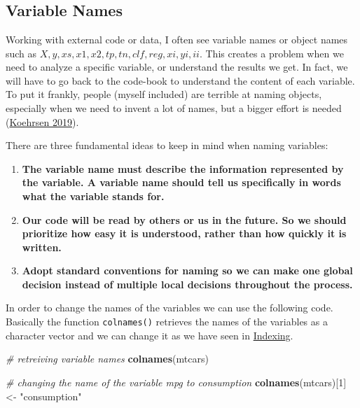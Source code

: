 \documentclass[
]{article}
\newenvironment{Shaded}{\begin{snugshade}}{\end{snugshade}}
\newcommand{\CommentTok}[1]{\textcolor[rgb]{0.56,0.35,0.01}{\textit{#1}}}
\newcommand{\DecValTok}[1]{\textcolor[rgb]{0.00,0.00,0.81}{#1}}
\newcommand{\FunctionTok}[1]{\textcolor[rgb]{0.13,0.29,0.53}{\textbf{#1}}}
\newcommand{\NormalTok}[1]{#1}
\newcommand{\OtherTok}[1]{\textcolor[rgb]{0.56,0.35,0.01}{#1}}
\newcommand{\StringTok}[1]{\textcolor[rgb]{0.31,0.60,0.02}{#1}}
\begin{document}
~

~

~

\hypertarget{variable-names}{%
\subsection{Variable Names}\label{variable-names}}

Working with external code or data, I often see variable names or object
names such as \(X, y, xs, x1, x2, tp, tn, clf, reg, xi, yi, ii\). This
creates a problem when we need to analyze a specific variable, or
understand the results we get. In fact, we will have to go back to the
code-book to understand the content of each variable. To put it frankly,
people (myself included) are terrible at naming objects, especially when
we need to invent a lot of names, but a bigger effort is needed
(\protect\hyperlink{ref-koehrsen2019}{Koehrsen 2019}).

There are three fundamental ideas to keep in mind when naming variables:

\begin{enumerate}
\def\labelenumi{\arabic{enumi}.}
\item
  \textbf{The variable name must describe the information represented by the
  variable. A variable name should tell us specifically in words what
  the variable stands for.}
\item
  \textbf{Our code will be read by others or us in the future. So we should
  prioritize how easy it is understood, rather than how quickly it is
  written.}
\item
  \textbf{Adopt standard conventions for naming so we can make one global
  decision instead of multiple local decisions throughout the
  process.}
\end{enumerate}

In order to change the names of the variables we can use the following
code. Basically the function \texttt{colnames()} retrieves the names of the
variables as a character vector and we can change it as we have seen in
\protect\hyperlink{indexing}{Indexing}.

\begin{Shaded}
\begin{Highlighting}[]
\CommentTok{\# retreiving variable names}
\FunctionTok{colnames}\NormalTok{(mtcars)}

\CommentTok{\# changing the name of the variable mpg to consumption}
\FunctionTok{colnames}\NormalTok{(mtcars)[}\DecValTok{1}\NormalTok{] }\OtherTok{\textless{}{-}} \StringTok{"consumption"}
\end{Highlighting}
\end{Shaded}
\end{document}
